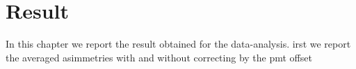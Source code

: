 \chapter{Result} \label{result}


In this chapter we report the result obtained for the data-analysis. irst we report the averaged asimmetries with and without correcting by the pmt offset

